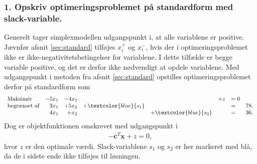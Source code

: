 \subsubsection{1. Opskriv optimeringsproblemet på standardform med slack-variable.}
%
Generelt tager simplexmodellen udgangspunkt i, at alle variablene er positive. Jævnfør afsnit \ref{sec:standard} tilføjes $x_i^+$ og $x_i^-$, hvis der i optimeringsproblemet ikke er ikke-negativitetsbetingelser for variablene. 
I dette tilfælde er begge variable positive, og det er derfor ikke nødvendigt at opdele variablene. 
Med udgangspunkt i metoden fra afsnit \ref{sec:standard} opstilles optimeringsproblemet derfor på standardform som
%
\begin{align*}
\begin{array}{lrrrrrlr}
\text{Maksimér}		& -5x_1 &-4x_2 &&& + z & =0\\
\text{begrænset af}	&3x_1& +5x_2	& + \textcolor{blue}{s_1} 	&&&= 	&78,\\
					&4x_1& + x_2	& & + \textcolor{blue}{s_2}	&&=	&	 36.\\
\end{array}
\end{align*}
Dog er objektfunktionen omskrevet med udgangspunkt i 
\begin{align*}
-\textbf{c}^T\textbf{x} + z	 =0,
\end{align*}
hvor $z$ er den optimale værdi. 
%
Slack-variablene $s_1$ og $s_2$ er her markeret med blå, da de i sidste ende ikke tilføjes til løsningen. 
%
